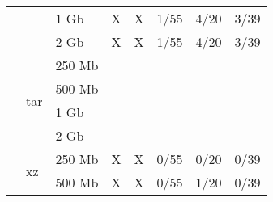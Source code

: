 \documentclass{article}           %
\begin{document}
\begin{table}[]
\begin{tabular}{lllccccc}
\multicolumn{1}{|l|}{}                               & \multicolumn{1}{l|}{}                     & \multicolumn{1}{l|}{1 Gb}   & \multicolumn{1}{c|}{\textsf{X}}       & \multicolumn{1}{c|}{\textsf{X}}       & \multicolumn{1}{c|}{1/55}           & \multicolumn{1}{c|}{4/20}      & \multicolumn{1}{c|}{3/39}        \\ \cline{3-8} 
\multicolumn{1}{|l|}{}                               & \multicolumn{1}{l|}{}                     & \multicolumn{1}{l|}{2 Gb}   & \multicolumn{1}{c|}{\textsf{X}}       & \multicolumn{1}{c|}{\textsf{X}}       & \multicolumn{1}{c|}{1/55}           & \multicolumn{1}{c|}{4/20}      & \multicolumn{1}{c|}{3/39}        \\ \cline{2-8} 
\multicolumn{1}{|l|}{}                               & \multicolumn{1}{l|}{\multirow{4}{*}{tar}} & \multicolumn{1}{l|}{250 Mb} & \multicolumn{1}{c|}{}       & \multicolumn{1}{c|}{}       & \multicolumn{1}{c|}{}           & \multicolumn{1}{c|}{}      & \multicolumn{1}{c|}{}        \\ \cline{3-8} 
\multicolumn{1}{|l|}{}                               & \multicolumn{1}{l|}{}                     & \multicolumn{1}{l|}{500 Mb} & \multicolumn{1}{c|}{}       & \multicolumn{1}{c|}{}       & \multicolumn{1}{c|}{}           & \multicolumn{1}{c|}{}      & \multicolumn{1}{c|}{}        \\ \cline{3-8} 
\multicolumn{1}{|l|}{}                               & \multicolumn{1}{l|}{}                     & \multicolumn{1}{l|}{1 Gb}   & \multicolumn{1}{c|}{}       & \multicolumn{1}{c|}{}       & \multicolumn{1}{c|}{}           & \multicolumn{1}{c|}{}      & \multicolumn{1}{c|}{}        \\ \cline{3-8} 
\multicolumn{1}{|l|}{}                               & \multicolumn{1}{l|}{}                     & \multicolumn{1}{l|}{2 Gb}   & \multicolumn{1}{c|}{}       & \multicolumn{1}{c|}{}       & \multicolumn{1}{c|}{}           & \multicolumn{1}{c|}{}      & \multicolumn{1}{c|}{}        \\ \cline{2-8} 
\multicolumn{1}{|l|}{}                               & \multicolumn{1}{l|}{\multirow{4}{*}{xz}}  & \multicolumn{1}{l|}{250 Mb} & \multicolumn{1}{c|}{\textsf{X}}       & \multicolumn{1}{c|}{\textsf{X}}       & \multicolumn{1}{c|}{0/55}           & \multicolumn{1}{c|}{0/20}      & \multicolumn{1}{c|}{0/39}        \\ \cline{3-8} 
\multicolumn{1}{|l|}{}                               & \multicolumn{1}{l|}{}                     & \multicolumn{1}{l|}{500 Mb} & \multicolumn{1}{c|}{\textsf{X}}       & \multicolumn{1}{c|}{\textsf{X}}       & \multicolumn{1}{c|}{0/55}           & \multicolumn{1}{c|}{1/20}      & \multicolumn{1}{c|}{0/39}        \\ \cline{3-8} 

\end{tabular}
\end{table}
\end{document}

